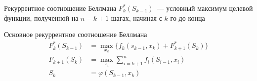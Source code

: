 \documentclass[unicode,11pt,notheorems,xcolor=table]{beamer}
\begin{document}
\begin{frame}{Рекуррентное соотношение Беллмана}{}
$F_k^*(S_{k-1})$~--- условный максимум целевой функции, полученной на  $n-k+1$  шагах, начиная с  $k$-го  до конца

\begin{block}{Основное рекуррентное соотношение Беллмана}
 \begin{align*}
 F_k^*(S_{k-1}) &=\max_{x_k} \big\{f_k(s_{k-1},x_k)+F_{k+1}^*(S_k) \big\}\\
 F_{k+1}(S_k) &= \max_{x_i} \sum_{i=k+1}^n f_i(S_{i-1},x_i)\\
 S_k &= \varphi (S_{k-1},x_k)
 \end{align*}
\end{block}

%

%
%

\end{frame}
\end{document}
